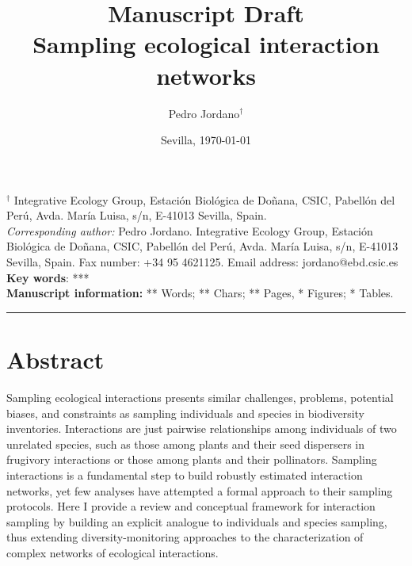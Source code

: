 \documentclass[a4paper,12pt]{article}
\begin{document}
\title{Manuscript Draft\\
\vspace{2cm}
Sampling ecological interaction networks}

\author{Pedro Jordano$^{\dag}$}

\date{Sevilla, \today}
\maketitle


\begin{spacing}{1.0}
$^{\dag}$ {\small Integrative Ecology Group, Estaci\'on Biol\'ogica de 
Do\~nana, CSIC, Pabell\'on del Per\'u, Avda. Mar\'ia Luisa, s/n, 
E-41013 Sevilla, Spain.}\\


{\small \textit{Corresponding author:} Pedro Jordano. Integrative Ecology Group, Estaci\'on Biol\'ogica de Do\~nana, CSIC, Pabell\'on del Per\'u, Avda. Mar\'ia Luisa, s/n, E-41013 Sevilla, Spain. Fax number: +34 95 4621125. Email address: jordano@ebd.csic.es}\\

\textbf{Key words}: ***\\

{\small \textbf{Manuscript information: }** Words; ** Chars; ** Pages, * Figures; * Tables.}
\maketitle
\newpage
\begin{center}\rule{3in}{0.4pt}\end{center}


\chapter{Abstract}
\label{abstract}

Sampling ecological interactions presents similar challenges, problems, potential biases, and constraints as sampling individuals and species in biodiversity inventories. Interactions are just pairwise relationships among individuals of two unrelated species, such as those among plants and their seed dispersers in frugivory interactions or those among plants and their pollinators. Sampling interactions is a fundamental step to build robustly estimated interaction networks, yet few analyses have attempted a formal approach to their sampling protocols.
Here I provide a review and conceptual framework for interaction sampling by building an explicit analogue to individuals and species sampling, thus extending diversity-monitoring approaches to the characterization of complex networks of ecological interactions. 


\end{spacing}
\end{document}
